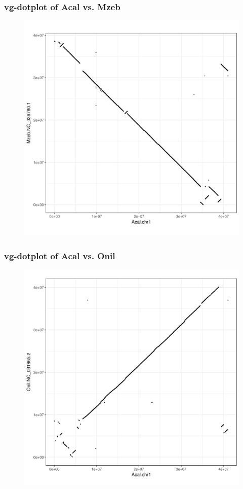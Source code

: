 \documentclass[aspectratio=169]{beamer}
\begin{document}
\begin{frame}
  \frametitle{vg-dotplot of Acal vs. Mzeb}
    \begin{figure}
      \includegraphics[scale=0.45,center]{Acal-Mzeb-dotplot.png}
    \end{figure}
\end{frame}

\begin{frame}
  \frametitle{vg-dotplot of Acal vs. Onil}
    \begin{figure}
      \includegraphics[scale=0.45,center]{Acal-Onil-dotplot.png}
    \end{figure}
\end{frame}
\end{document}
